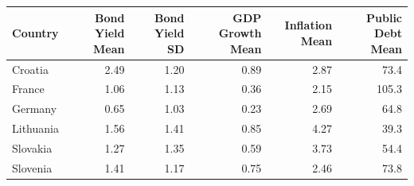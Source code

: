\begin{tabular}{lrrrrr}
\hline
Country & Bond Yield Mean & Bond Yield SD & GDP Growth Mean & Inflation Mean & Public Debt Mean \\
\hline
Croatia & 2.49 & 1.20 & 0.89 & 2.87 & 73.4 \\
France & 1.06 & 1.13 & 0.36 & 2.15 & 105.3 \\
Germany & 0.65 & 1.03 & 0.23 & 2.69 & 64.8 \\
Lithuania & 1.56 & 1.41 & 0.85 & 4.27 & 39.3 \\
Slovakia & 1.27 & 1.35 & 0.59 & 3.73 & 54.4 \\
Slovenia & 1.41 & 1.17 & 0.75 & 2.46 & 73.8 \\
\hline
\end{tabular}
